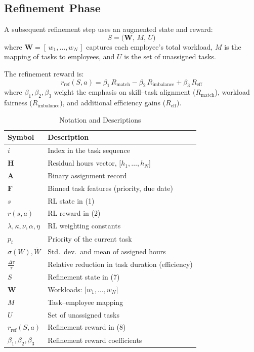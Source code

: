 \documentclass[%
aip,
cp,  %
amsmath,amssymb,
reprint,%
]{revtex4-2}
\begin{document}
	\subsection{\label{subsec:refinement}Refinement Phase}
	
	A subsequent refinement step uses an augmented state and reward:
	\begin{equation}
		S = \bigl(\mathbf{W},\, M,\, U\bigr)
	\end{equation}
	where $\mathbf{W}=[\,w_{1},\dots,w_{N}\,]$ captures each employee's total workload, $M$ is the mapping of tasks to employees, and $U$ is the set of unassigned tasks.
	
	The refinement reward is:
	\begin{equation}
		r_{\text{ref}}(S,a) = \beta_{1}\,R_{\text{match}}-\beta_{2}\,R_{\text{imbalance}}+\beta_{3}\,R_{\text{eff}}
	\end{equation}
	where $\beta_{1},\beta_{2},\beta_{3}$ weight the emphasis on skill--task alignment ($R_{\text{match}}$), workload fairness ($R_{\text{imbalance}}$), and additional efficiency gains ($R_{\text{eff}}$).
	
	\begin{table}
		\caption{\label{tab:notation}Notation and Descriptions}
		\begin{ruledtabular}
			\begin{tabular}{ll}
				\textbf{Symbol} & \textbf{Description} \\
				\hline
				$i$ & Index in the task sequence\\
				$\mathbf{H}$ & Residual hours vector, $\bigl[h_{1},\dots,h_{N}\bigr]$\\
				$\mathbf{A}$ & Binary assignment record \\
				$\mathbf{F}$ & Binned task features (priority, due date)\\
				$s$ & RL state in (1)\\
				$r(s,a)$ & RL reward in (2)\\
				$\lambda,\kappa,\nu,\alpha,\eta$ & RL weighting constants\\
				$p_{t}$ & Priority of the current task\\
				$\sigma(W), \overline{W}$ & Std.\ dev.\ and mean of assigned hours\\
				$\tfrac{\Delta\tau}{\tau}$ & Relative reduction in task duration (efficiency)\\
				$S$ & Refinement state in (7)\\
				$\mathbf{W}$ & Workloads: $\bigl[w_{1},\dots,w_{N}\bigr]$\\
				$M$ & Task--employee mapping \\
				$U$ & Set of unassigned tasks\\
				$r_{\text{ref}}(S,a)$ & Refinement reward in (8)\\
				$\beta_{1},\beta_{2},\beta_{3}$ & Refinement reward coefficients\\
			\end{tabular}
		\end{ruledtabular}
	\end{table}
	
\end{document}
